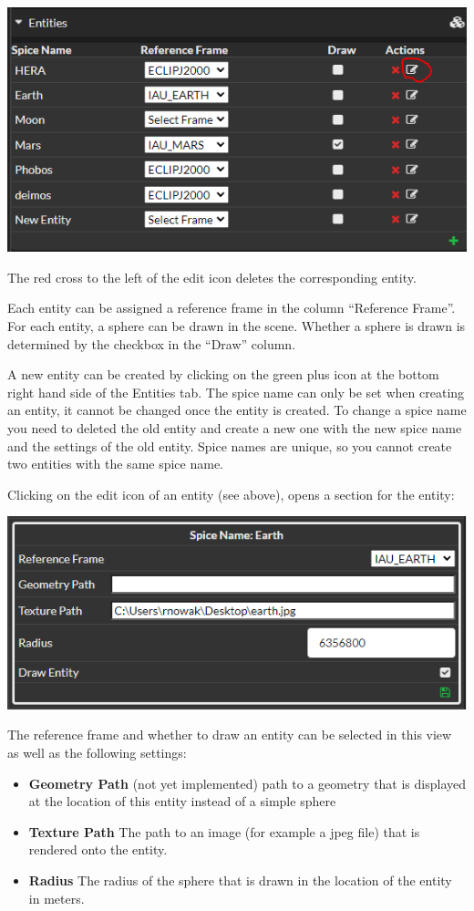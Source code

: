 \includegraphics{images/editEntities.png}

The red cross to the left of the edit icon deletes the corresponding
entity.

Each entity can be assigned a reference frame in the column ``Reference
Frame''. For each entity, a sphere can be drawn in the scene. Whether a
sphere is drawn is determined by the checkbox in the ``Draw'' column.

A new entity can be created by clicking on the green plus icon at the
bottom right hand side of the Entities tab. The spice name can only be
set when creating an entity, it cannot be changed once the entity is
created. To change a spice name you need to deleted the old entity and
create a new one with the new spice name and the settings of the old
entity. Spice names are unique, so you cannot create two entities with
the same spice name.

Clicking on the edit icon of an entity (see above), opens a section for
the entity:

\includegraphics{images/editEntity.png}

The reference frame and whether to draw an entity can be selected in
this view as well as the following settings:

\begin{itemize}
\tightlist
\item
  \textbf{Geometry Path} (not yet implemented) path to a geometry that
  is displayed at the location of this entity instead of a simple sphere
\item
  \textbf{Texture Path} The path to an image (for example a jpeg file)
  that is rendered onto the entity.
\item
  \textbf{Radius} The radius of the sphere that is drawn in the location
  of the entity in meters.
\end{itemize}

